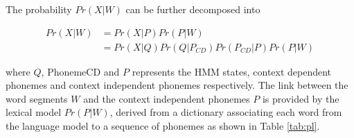The probability $Pr(X|W)$ can be further decomposed into 

\begin{align}
     Pr(X|W)        & = Pr(X|P) Pr(P|W) \\
      & = Pr(X|Q) Pr(Q|P_{CD}) Pr(P_{CD}|P) Pr(P|W)
\end{align}

where $Q$, \gls{PhonemeCD} and $P$ represents the HMM states, context dependent phonemes and context independent phonemes respectively. The link between the word segments $W$ and  the context independent phonemes  $P$ is provided by the lexical model  $Pr(P|W)$, derived from  a dictionary associating each word from the language model to a sequence of phonemes as shown in Table \ref{tab:pl}. 



